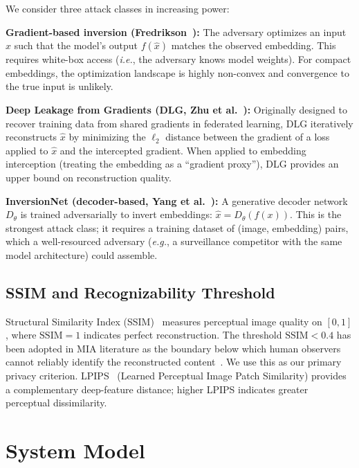 \documentclass[journal]{IEEEtran}
\newcommand{\ssim}{\mathrm{SSIM}}
\newcommand{\ie}{\textit{i.e.},\xspace}
\newcommand{\eg}{\textit{e.g.},\xspace}
\begin{document}
We consider three attack classes in increasing power:

\textbf{Gradient-based inversion (Fredrikson~\cite{Fredrikson2015}):}
The adversary optimizes an input $\hat{x}$ such that the
model's output $f(\hat{x})$ matches the observed embedding.
This requires white-box access (\ie the adversary knows model weights).
For compact embeddings, the optimization landscape is highly non-convex
and convergence to the true input is unlikely.

\textbf{Deep Leakage from Gradients (DLG, Zhu et al.~\cite{Zhu2019}):}
Originally designed to recover training data from shared gradients in
federated learning, DLG iteratively reconstructs $\hat{x}$ by minimizing
the $\ell_2$ distance between the gradient of a loss applied to $\hat{x}$
and the intercepted gradient.
When applied to embedding interception (treating the embedding as a
``gradient proxy''), DLG provides an upper bound on reconstruction
quality.

\textbf{InversionNet (decoder-based, Yang et al.~\cite{Yang2019}):}
A generative decoder network $D_\theta$ is trained adversarially to
invert embeddings: $\hat{x} = D_\theta(f(x))$.
This is the strongest attack class; it requires a training dataset
of (image, embedding) pairs, which a well-resourced adversary
(\eg a surveillance competitor with the same model architecture)
could assemble.

\subsection{SSIM and Recognizability Threshold}

Structural Similarity Index (SSIM)~\cite{Wang2004} measures perceptual
image quality on $[0,1]$, where $\ssim = 1$ indicates perfect
reconstruction.
The threshold $\ssim < 0.4$ has been adopted in MIA literature as
the boundary below which human observers cannot reliably identify the
reconstructed content~\cite{Fredrikson2015}.
We use this as our primary privacy criterion.
LPIPS~\cite{Zhang2018} (Learned Perceptual Image Patch Similarity)
provides a complementary deep-feature distance;
higher LPIPS indicates greater perceptual dissimilarity.

\section{System Model}
\label{sec:sysmodel}
\end{document}
